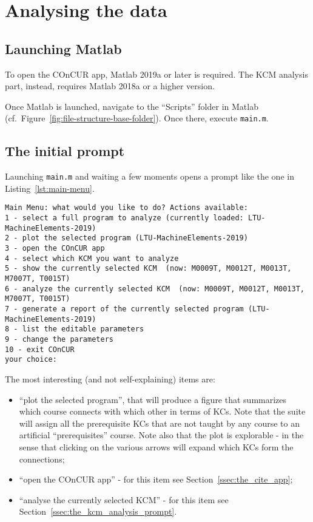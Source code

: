 \section{Analysing the data} \label{sec:analysing_the_data}

\subsection{Launching Matlab}

To open the COnCUR app, Matlab 2019a or later is required. The KCM analysis
part, instead, requires Matlab 2018a or a higher version.

Once Matlab is launched, navigate to the ``Scripts'' folder in Matlab (cf.\
Figure~\ref{fig:file-structure-base-folder}). Once there, execute
\texttt{main.m}.

\subsection{The initial prompt}

Launching \texttt{main.m} and waiting a few moments opens a prompt like the
one in Listing~\ref{lst:main-menu}.

\begin{lstlisting}[caption=The main menu.,label=lst:main-menu]
Main Menu: what would you like to do? Actions available:
1 - select a full program to analyze (currently loaded: LTU-MachineElements-2019)
2 - plot the selected program (LTU-MachineElements-2019)
3 - open the COnCUR app
4 - select which KCM you want to analyze
5 - show the currently selected KCM  (now: M0009T, M0012T, M0013T, M7007T, T0015T)
6 - analyze the currently selected KCM  (now: M0009T, M0012T, M0013T, M7007T, T0015T)
7 - generate a report of the currently selected program (LTU-MachineElements-2019)
8 - list the editable parameters
9 - change the parameters
10 - exit COnCUR
your choice: 
\end{lstlisting}

The most interesting (and not self-explaining) items are:
%
\begin{itemize}
\item ``plot the selected program'', that will produce a figure that
	summarizes which course connects with which other in terms of
	\acp{KC}. Note that the suite will assign all the
	prerequisite \acp{KC} that are not taught by any course to an
	artificial ``prerequisites'' course. Note also that the plot is
	explorable - in the sense that clicking on the various arrows will
	expand which \acp{KC} form the connections; 
\item ``open the COnCUR app'' - for this item see
	Section~\ref{ssec:the_cite_app};
\item ``analyse the currently selected KCM'' - for this item see
	Section~\ref{ssec:the_kcm_analysis_prompt}.
\end{itemize}


